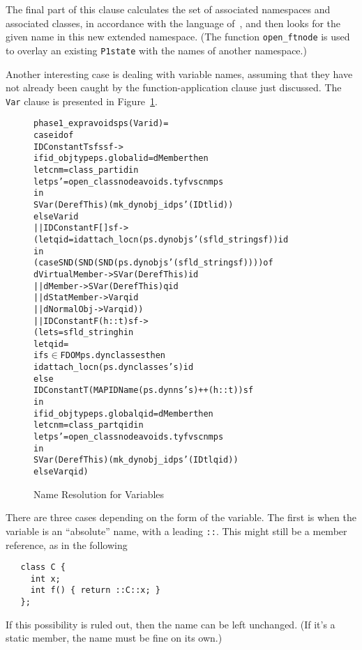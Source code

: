 \documentclass[11pt]{article}
\begin{document}
The final part of this clause calculates the set of associated
namespaces and associated classes, in accordance with the language
of~\cite[\S3.4.2, paragraph~2]{cpp-standard-iso14882}, and then looks
for the given name in this new extended namespace.  (The function
\texttt{open_ftnode} is used to overlay an existing \texttt{P1state}
with the names of another namespace.)

\bigskip
\noindent
Another interesting case is dealing with variable names, assuming that
they have not already been caught by the function-application clause
just discussed.  The \texttt{Var} clause is presented in
Figure~\ref{fig:phase1expr:var}. 
\begin{figure}[htbp]
\begin{alltt}
   phase1_expr avoids ps (Var id) =
      case id of
         IDConstant T sfs sf ->
           if id_objtype ps.global id = dMember then
             let cnm = class_part id in
             let ps' = open_classnode avoids.tyfvs cnm ps
             in
               SVar (Deref This) (mk_dynobj_id ps' (IDtl id))
           else Var id
      || IDConstant F [] sf ->
           (let qid = idattach_locn (ps.dynobjs ' (sfld_string sf)) id
            in
              (case SND (SND (SND (ps.dynobjs ' (sfld_string sf)))) of
                  dVirtualMember -> SVar (Deref This) id
               || dMember -> SVar (Deref This) qid
               || dStatMember -> Var qid
               || dNormalObj -> Var qid))
      || IDConstant F (h::t) sf ->
           (let s = sfld_string h in
            let qid =
                if s \(\in\) FDOM ps.dynclasses then
                  idattach_locn (ps.dynclasses ' s) id
                else
                  IDConstant T (MAP IDName (ps.dynns ' s) ++ (h::t)) sf
            in
              if id_objtype ps.global qid = dMember then
                let cnm = class_part qid in
                let ps' = open_classnode avoids.tyfvs cnm ps
                in
                  SVar (Deref This) (mk_dynobj_id ps' (IDtl qid))
              else Var qid)
\end{alltt}
\caption{Name Resolution for Variables}
\label{fig:phase1expr:var}
\end{figure}
There are three cases depending on the form of the variable.  The
first is when the variable is an ``absolute'' name, with a leading
\texttt{::}.  This might still be a member reference, as in the
following
\begin{verbatim}
   class C {
     int x;
     int f() { return ::C::x; }
   };
\end{verbatim}
If this possibility is ruled out, then the name can be left
unchanged.  (If it's a static member, the name must be fine on its
own.)
\end{document}
